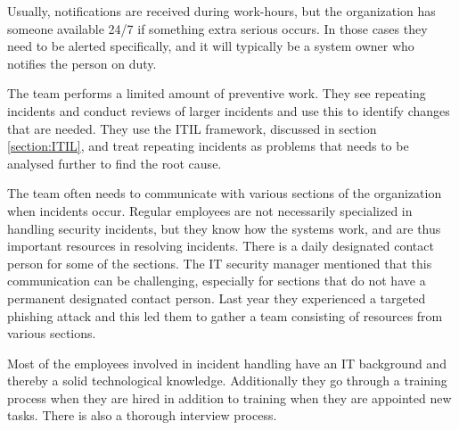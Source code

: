 Usually, notifications are received during work-hours, but the organization has someone available 24/7 if something extra serious occurs. In those cases they need to be alerted specifically, and it will typically be a system owner who notifies the person on duty.


The team performs a limited amount of preventive work. They see repeating incidents and conduct reviews of larger incidents and use this to identify changes that are needed. They use the \ac{ITIL} framework, discussed in section \ref{section:ITIL}, and treat repeating incidents as problems that needs to be analysed further to find the root cause.

The team often needs to communicate with various sections of the organization when incidents occur. Regular employees are not necessarily specialized in handling security incidents, but they know how the systems work, and are thus important resources in resolving incidents. There is a daily designated contact person for some of the sections. The IT security manager mentioned that this communication can be challenging, especially for sections that do not have a permanent designated contact person. Last year they experienced a targeted phishing attack and this led them to gather a team consisting of resources from various sections.

Most of the employees involved in incident handling have an IT background and thereby a solid technological knowledge. Additionally they go through a training process when they are hired in addition to training when they are appointed new tasks. There is also a thorough interview process.

